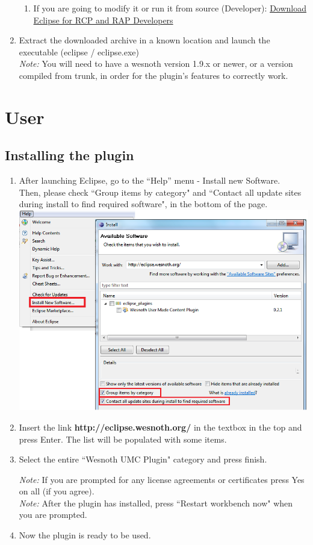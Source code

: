 \documentclass[10pt]{article}
\begin{document}
\begin{enumerate}
\begin{enumerate}
\item If you are going to modify it or run it from source (Developer):  \href{http://eclipse.org/downloads/packages/eclipse-rcp-and-rap-developers/heliosr}{Download Eclipse for RCP and RAP Developers}
\end{enumerate}
\item Extract the downloaded archive in a known location and launch the executable (eclipse / eclipse.exe)\\
\textit{Note:} You will need to have a wesnoth version 1.9.x or newer, or a version compiled from trunk, in order for the plugin's features to correctly work.
\end{enumerate}

\section{User}
\subsection{Installing the plugin}
\begin{enumerate}
\item After launching Eclipse, go to the ``Help'' menu - Install new Software.\\
  Then, please check ``Group items by category" and ``Contact all update sites during install to find required software", in the bottom of the page.\\ \includegraphics[width=550px]{install_new_software.png}
\item Insert the link \textbf{http://eclipse.wesnoth.org/} in the textbox in the top and press Enter. The list will be populated with some items.
\item Select the entire ``Wesnoth UMC Plugin" category and press finish.

\textit{Note:} If you are prompted for any license agreements or certificates press Yes on all (if you agree).\\
\textit{Note:} After the plugin has installed, press ``Restart workbench now" when you are prompted.
\item Now the plugin is ready to be used.
\end{enumerate}
\end{document}
